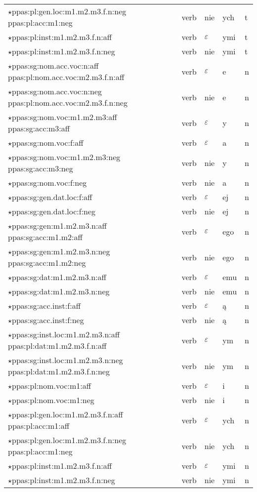 \documentclass{article}
\begin{document}
\begin{longtable}{p{7cm}|l|l|l|l}
$\star$ppas:pl:gen.loc:m1.m2.m3.f.n:neg ppas:pl:acc:m1:neg & verb & nie & ych & t\\
$\star$ppas:pl:inst:m1.m2.m3.f.n:aff & verb & $\varepsilon$ & ymi & t\\
$\star$ppas:pl:inst:m1.m2.m3.f.n:neg & verb & nie & ymi & t\\
$\star$ppas:sg:nom.acc.voc:n:aff ppas:pl:nom.acc.voc:m2.m3.f.n:aff & verb & $\varepsilon$ & e & n\\
$\star$ppas:sg:nom.acc.voc:n:neg ppas:pl:nom.acc.voc:m2.m3.f.n:neg & verb & nie & e & n\\
$\star$ppas:sg:nom.voc:m1.m2.m3:aff ppas:sg:acc:m3:aff & verb & $\varepsilon$ & y & n\\
$\star$ppas:sg:nom.voc:f:aff & verb & $\varepsilon$ & a & n\\
$\star$ppas:sg:nom.voc:m1.m2.m3:neg ppas:sg:acc:m3:neg & verb & nie & y & n\\
$\star$ppas:sg:nom.voc:f:neg & verb & nie & a & n\\
$\star$ppas:sg:gen.dat.loc:f:aff & verb & $\varepsilon$ & ej & n\\
$\star$ppas:sg:gen.dat.loc:f:neg & verb & nie & ej & n\\
$\star$ppas:sg:gen:m1.m2.m3.n:aff ppas:sg:acc:m1.m2:aff & verb & $\varepsilon$ & ego & n\\
$\star$ppas:sg:gen:m1.m2.m3.n:neg ppas:sg:acc:m1.m2:neg & verb & nie & ego & n\\
$\star$ppas:sg:dat:m1.m2.m3.n:aff & verb & $\varepsilon$ & emu & n\\
$\star$ppas:sg:dat:m1.m2.m3.n:neg & verb & nie & emu & n\\
$\star$ppas:sg:acc.inst:f:aff & verb & $\varepsilon$ & ą & n\\
$\star$ppas:sg:acc.inst:f:neg & verb & nie & ą & n\\
$\star$ppas:sg:inst.loc:m1.m2.m3.n:aff ppas:pl:dat:m1.m2.m3.f.n:aff & verb & $\varepsilon$ & ym & n\\
$\star$ppas:sg:inst.loc:m1.m2.m3.n:neg ppas:pl:dat:m1.m2.m3.f.n:neg & verb & nie & ym & n\\
$\star$ppas:pl:nom.voc:m1:aff & verb & $\varepsilon$ & i & n\\
$\star$ppas:pl:nom.voc:m1:neg & verb & nie & i & n\\
$\star$ppas:pl:gen.loc:m1.m2.m3.f.n:aff ppas:pl:acc:m1:aff & verb & $\varepsilon$ & ych & n\\
$\star$ppas:pl:gen.loc:m1.m2.m3.f.n:neg ppas:pl:acc:m1:neg & verb & nie & ych & n\\
$\star$ppas:pl:inst:m1.m2.m3.f.n:aff & verb & $\varepsilon$ & ymi & n\\
$\star$ppas:pl:inst:m1.m2.m3.f.n:neg & verb & nie & ymi & n\\
\end{longtable}
\end{document}
